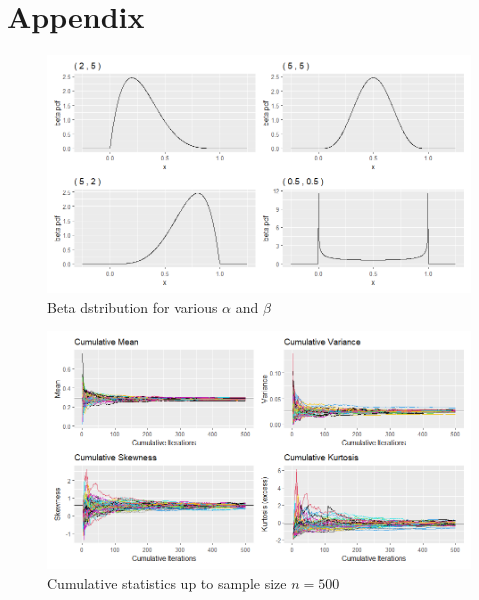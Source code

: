 \documentclass{article}\usepackage[]{graphicx}\usepackage[]{xcolor}
\begin{document}
\newpage
\onecolumn
\section{Appendix}

\begin{figure}[h]
  \begin{center}
  \begin{minipage}{0.75\textwidth}
    \includegraphics[width=\textwidth]{BetaDistributions.png}
    \caption{Beta dstribution for various $\alpha$ and $\beta$}
    \label{fig1}
   \end{minipage}
   \end{center}
\end{figure}

\begin{figure}[h]
  \begin{center}
  \begin{minipage}{0.75\textwidth}
    \includegraphics[width=\textwidth]{cumplots.png}
    \caption{Cumulative statistics up to sample size $n = 500$}
    \label{fig2}
   \end{minipage}
   \end{center}
\end{figure}
\end{document}
